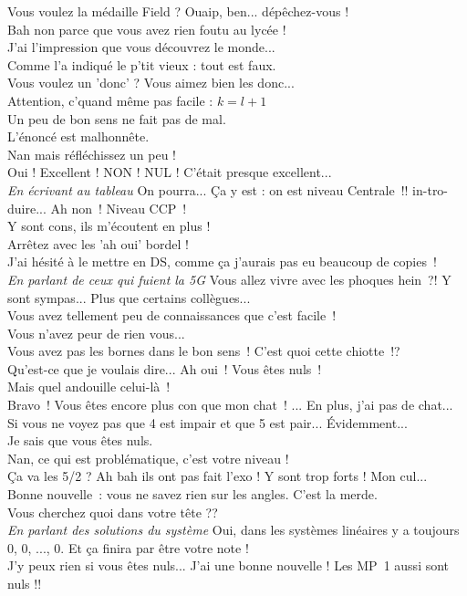 \documentclass[french, a4paper, openany]{book}
\begin{document}
	\noindent \og Vous voulez la médaille Field ? Ouaip, ben... dépêchez-vous ! \fg \\
	\og Bah non parce que vous avez rien foutu au lycée ! \fg \\
	\og J'ai l'impression que vous découvrez le monde... \fg \\
	\og Comme l'a indiqué le p'tit vieux : tout est faux. \fg \\
	\og Vous voulez un 'donc' ? Vous aimez bien les donc... \fg \\
	\og Attention, c'quand même pas facile : $k = l+ 1$ \fg \\
	\og Un peu de bon sens ne fait pas de mal. \fg \\
	\og L'énoncé est malhonnête. \fg \\
	\og Nan mais réfléchissez un peu ! \fg \\
	\og Oui ! Excellent ! NON ! NUL ! C'était presque excellent... \fg \\
	\emph{En écrivant au tableau} \og On pourra... Ça y est : on est niveau Centrale~!! in-tro-duire... Ah non~! Niveau CCP~! \fg \\
	\og Y sont cons, ils m'écoutent en plus ! \fg \\
	\og Arrêtez avec les 'ah oui' bordel ! \fg \\
	\og J'ai hésité à le mettre en DS, comme ça j'aurais pas eu beaucoup de copies~!\fg \\
	\emph{En parlant de ceux qui fuient la 5G} \og Vous allez vivre avec les phoques hein~?! Y sont sympas... Plus que certains collègues... \fg \\
	\og Vous avez tellement peu de connaissances que c'est facile~! \fg \\
	\og Vous n'avez peur de rien vous... \fg \\	
	\og Vous avez pas les bornes dans le bon sens~! C'est quoi cette chiotte~!? \fg \\
	\og Qu'est-ce que je voulais dire... Ah oui~! Vous êtes nuls~! \fg \\
	\og Mais quel andouille celui-là~! \fg \\
	\og Bravo~! Vous êtes encore plus con que mon chat~! ... En plus, j'ai pas de chat... \fg \\
	\og Si vous ne voyez pas que 4 est impair et que 5 est pair... Évidemment... \fg \\
	\og Je sais que vous êtes nuls. \fg \\
	\og Nan, ce qui est problématique, c'est votre niveau ! \fg \\
	\og Ça va les 5/2 ? Ah bah ils ont pas fait l'exo ! Y sont trop forts ! Mon cul... \fg \\
	\og Bonne nouvelle~: vous ne savez rien sur les angles. C'est la merde. \fg \\
	\og Vous cherchez quoi dans votre tête ?? \fg \\
	\emph{En parlant des solutions du système} \og Oui, dans les systèmes linéaires y a toujours 0, 0, ..., 0. Et ça finira par être votre note ! \fg \\
	\og J'y peux rien si vous êtes nuls... J'ai une bonne nouvelle ! Les MP~1 aussi sont nuls !! \fg \\
	
\end{document}
